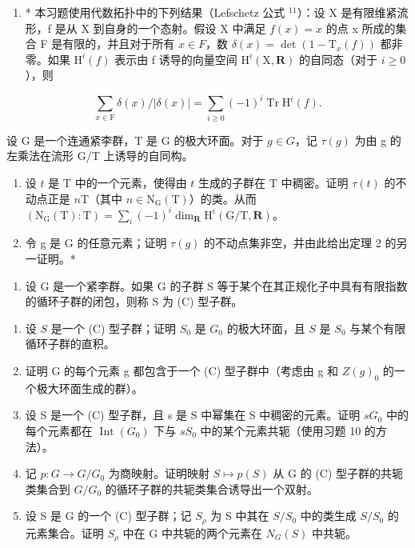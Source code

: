 \begin{enumerate}
\def\labelenumi{\arabic{enumi})}
\setcounter{enumi}{9}
\tightlist
\item
  * 本习题使用代数拓扑中的下列结果（Lefschetz 公式 \(^{11}\)）：设 X 是有限维紧流形，f 是从 X 到自身的一个态射。假设 X 中满足 \(f(x) = x\) 的点 x 所成的集合 F 是有限的，并且对于所有 \(x \in F\)，数 \(\delta(x) = \det(1 - \mathrm{T}_{x}(f))\) 都非零。如果 \(\mathrm{H}^{i}(f)\) 表示由 f 诱导的向量空间 \(\mathrm{H}^{i}(\mathrm{X}, \mathbf{R})\) 的自同态（对于 \(i \geq 0\)），则
\end{enumerate}

\[
\sum_ {x \in \mathrm{F}} \delta (x) / | \delta (x) | = \sum_ {i \geq 0} (- 1) ^ {i} \operatorname{Tr} \mathrm{H} ^ {i} (f).
\]

设 G 是一个连通紧李群，T 是 G 的极大环面。对于 \(g \in G\)，记 \(\tau(g)\) 为由 g 的左乘法在流形 G/T 上诱导的自同构。

\begin{enumerate}
\def\labelenumi{\alph{enumi})}
\item
  设 \(t\) 是 \(\mathrm{T}\) 中的一个元素，使得由 \(t\) 生成的子群在 \(\mathrm{T}\) 中稠密。证明 \(\tau(t)\) 的不动点正是 \(n\mathrm{T}\)（其中 \(n \in \mathrm{N}_{\mathrm{G}}(\mathrm{T})\)）的类。从而 \((\mathrm{N}_{\mathrm{G}}(\mathrm{T}):\mathrm{T}) = \sum_{i}(-1)^{i}\dim_{\mathbf{R}}\mathrm{H}^{i}(\mathrm{G / T},\mathbf{R})\)。
\item
  令 g 是 G 的任意元素；证明 \(\tau(g)\) 的不动点集非空，并由此给出定理 2 的另一证明。*
\end{enumerate}

\begin{enumerate}
\def\labelenumi{\arabic{enumi})}
\setcounter{enumi}{10}
\tightlist
\item
  设 G 是一个紧李群。如果 G 的子群 S 等于某个在其正规化子中具有有限指数的循环子群的闭包，则称 S 为 (C) 型子群。
\end{enumerate}

\begin{enumerate}
\def\labelenumi{\alph{enumi})}
\item
  设 \(S\) 是一个 (C) 型子群；证明 \(S_0\) 是 \(G_0\) 的极大环面，且 \(S\) 是 \(S_0\) 与某个有限循环子群的直积。
\item
  证明 G 的每个元素 g 都包含于一个 (C) 型子群中（考虑由 g 和 \(Z(g)_{0}\) 的一个极大环面生成的群）。
\item
  设 S 是一个 (C) 型子群，且 s 是 S 中幂集在 S 中稠密的元素。证明 \(sG_{0}\) 中的每个元素都在 \(\operatorname{Int}(G_{0})\) 下与 \(sS_{0}\) 中的某个元素共轭（使用习题 10 的方法）。
\item
  记 \(p: G \to G/G_{0}\) 为商映射。证明映射 \(S \mapsto p(S)\) 从 G 的 (C) 型子群的共轭类集合到 \(G/G_{0}\) 的循环子群的共轭类集合诱导出一个双射。
\item
  设 S 是 G 的一个 (C) 型子群；记 \(S_{\rho}\) 为 S 中其在 \(S/S_{0}\) 中的类生成 \(S/S_{0}\) 的元素集合。证明 \(S_{\rho}\) 中在 G 中共轭的两个元素在 \(N_{G}(S)\) 中共轭。
\end{enumerate}
